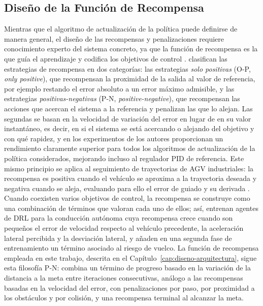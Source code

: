 \subsection{Diseño de la Función de Recompensa}\label{sec:fund-recompensa}
Mientras que el algoritmo de actualización de la política puede definirse de manera general, el diseño de las recompensas y penalizaciones requiere conocimiento experto del sistema concreto, ya que la función de recompensa es la que guía el aprendizaje y codifica los objetivos de control \citep{sierragarcia2020exploring, gilmacia2025exponential}. \citet{sierragarcia2020exploring} clasifican las estrategias de recompensa en dos categorías: las estrategias \textit{solo positivas} (O-P, \textit{only positive}), que recompensan la proximidad de la salida al valor de referencia, por ejemplo restando el error absoluto a un error máximo admisible, y las estrategias \textit{positivas-negativas} (P-N, \textit{positive-negative}), que recompensan las acciones que acercan el sistema a la referencia y penalizan las que lo alejan. Las segundas se basan en la velocidad de variación del error en lugar de en su valor instantáneo, es decir, en si el sistema se está acercando o alejando del objetivo y con qué rapidez, y en los experimentos de los autores proporcionan un rendimiento claramente superior para todos los algoritmos de actualización de la política considerados, mejorando incluso al regulador PID de referencia. Este mismo principio se aplica al seguimiento de trayectorias de AGV industriales: la recompensa es positiva cuando el vehículo se aproxima a la trayectoria deseada y negativa cuando se aleja, evaluando para ello el error de guiado y su derivada \citep{sierragarcia2024federated, sierragarcia2024combining}. Cuando coexisten varios objetivos de control, la recompensa se construye como una combinación de términos que valoran cada uno de ellos; así, \citet{barreno2025novel} entrenan agentes de DRL para la conducción autónoma cuya recompensa crece cuando son pequeños el error de velocidad respecto al vehículo precedente, la aceleración lateral percibida y la desviación lateral, y añaden en una segunda fase de entrenamiento un término asociado al riesgo de vuelco. La función de recompensa empleada en este trabajo, descrita en el Capítulo~\ref{cap:diseno-arquitectura}, sigue esta filosofía P-N: combina un término de progreso basado en la variación de la distancia a la meta entre iteraciones consecutivas, análogo a las recompensas basadas en la velocidad del error, con penalizaciones por paso, por proximidad a los obstáculos y por colisión, y una recompensa terminal al alcanzar la meta.

